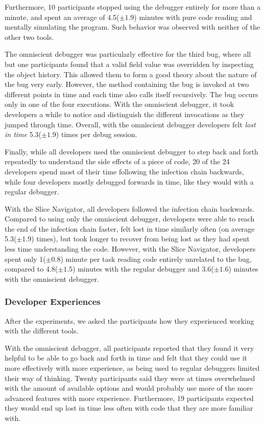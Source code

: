 \documentclass[
			english,
			review,
			]{elsarticle}
\begin{document}
Furthermore, 10 participants stopped using the debugger entirely for more than a minute, and spent an average of 4.5($\pm1.9$) minutes with pure code reading and mentally simulating the program.
Such behavior was observed with neither of the other two tools.

The omniscient debugger was particularly effective for the third bug, where all but one participants found that a valid field value was overridden by inspecting the object history.
This allowed them to form a good theory about the nature of the bug very early.
However, the method containing the bug is invoked at two different points in time and each time also calls itself recursively.
The bug occurs only in one of the four executions.
With the omniscient debugger, it took developers a while to notice and distinguish the different invocations as they jumped through time.
Overall, with the omniscient debugger developers felt \emph{lost in time} 5.3($\pm1.9$) times per debug session.

Finally, while all developers used the omniscient debugger to step back and forth repeatedly to understand the side effects of a piece of code, 20 of the 24 developers spend most of their time following the infection chain backwards, while four developers mostly debugged forwards in time, like they would with a regular debugger.

With the Slice Navigator, all developers followed the infection chain backwards.
Compared to using only the omniscient debugger, developers were able to reach the end of the infection chain faster, felt lost in time similarly often (on average 5.3($\pm1.9$) times), but took longer to recover from being lost as they had spent less time understanding the code.
However, with the Slice Navigator, developers spent only 1($\pm0.8$) minute per task reading code entirely unrelated to the bug, compared to 4.8($\pm1.5$) minutes with the regular debugger and 3.6($\pm1.6$) minutes with the omniscient debugger.

\subsubsection{Developer Experiences}

After the experiments, we asked the participants how they experienced working with the different tools.

With the omniscient debugger, all participants reported that they found it very helpful to be able to go back and forth in time and felt that they could use it more effectively with more experience, as being used to regular debuggers limited their way of thinking.
Twenty participants said they were at times overwhelmed with the amount of available options and would probably use more of the more advanced features with more experience.
Furthermore, 19 participants expected they would end up lost in time less often with code that they are more familiar with.
\end{document}
